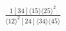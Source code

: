 \documentclass[varwidth, border=5pt]{standalone}
\begin{document}
\begin{my}
$\begin{gathered}
\scriptscriptstyle\frac{1[34]⟨15⟩⟨25⟩^2}{⟨12⟩^2[24]⟨34⟩⟨45⟩}
\end{gathered}$
\end{my}
\end{document}
